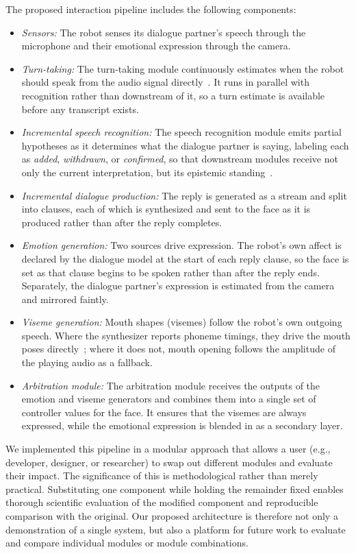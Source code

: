 \documentclass[conference]{IEEEtran}
\begin{document}
The proposed interaction pipeline includes the following components:
\begin{itemize}
  \item \textit{Sensors:} The robot senses its dialogue partner's speech through the microphone and their emotional expression through the camera.
  \item \textit{Turn-taking:} The turn-taking module continuously estimates when the robot should speak from the audio signal directly~\cite{skantze2021review, ekstedt2022vap}. It runs in parallel with recognition rather than downstream of it, so a turn estimate is available before any transcript exists.
  \item \textit{Incremental speech recognition:} The speech recognition module emits partial hypotheses as it determines what the dialogue partner is saying, labeling each as \textit{added}, \textit{withdrawn}, or \textit{confirmed}, so that downstream modules receive not only the current interpretation, but its epistemic standing~\cite{schlangen2011iu,michael2020retico}.
  \item \textit{Incremental dialogue production:} The reply is generated as a stream and split into clauses, each of which is synthesized and sent to the face as it is produced rather than after the reply completes.
  \item \textit{Emotion generation:} Two sources drive expression. The robot's own affect is declared by the dialogue model at the start of each reply clause, so the face is set as that clause begins to be spoken rather than after the reply ends. Separately, the dialogue partner's expression is estimated from the camera and mirrored faintly.
  \item \textit{Viseme generation:} Mouth shapes (visemes) follow the robot's own outgoing speech. Where the synthesizer reports phoneme timings, they drive the mouth poses directly~\cite{edwards2016jali,zhou2018visemenet}; where it does not, mouth opening follows the amplitude of the playing audio as a fallback.
  \item \textit{Arbitration module:} The arbitration module receives the outputs of the emotion and viseme generators and combines them into a single set of controller values for the face. It ensures that the visemes are always expressed, while the emotional expression is blended in as a secondary layer.
\end{itemize}



We implemented this pipeline in a modular approach that allows a user (e.g., developer, designer, or researcher) to swap out different modules and evaluate their impact. The
significance of this is methodological rather than merely practical. Substituting one component while holding the remainder fixed enables thorough scientific evaluation of the modified component and reproducible comparison with the original. Our proposed architecture is therefore not only a demonstration of a single system, but also a platform for future work to evaluate and compare individual modules or module combinations.
\end{document}
